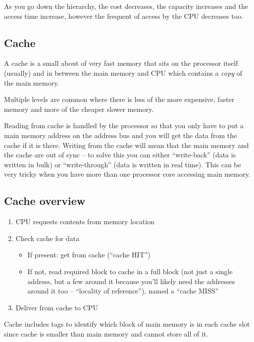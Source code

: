 As you go down the hierarchy, the cost decreases, the capacity increases and the access time increase, however the frequent of access by the CPU decreases too.

\subsection{Cache}\label{sub:cache}

A cache is a small about of very fast memory that sits on the processor itself (usually) and in between the main memory and CPU which contains a \emph{copy} of the main memory.

Multiple levels are common where there is less of the more expensive, faster memory and more of the cheaper slower memory.

Reading from cache is handled by the processor so that you only have to put a main memory address on the address bus and you will get the data from the cache if it is there.
Writing from the cache will mean that the main memory and the cache are out of sync -- to solve this you can either ``write-back'' (data is written in bulk) or ``write-through'' (data is written in real time).
This can be very tricky when you have more than one processor core accessing main memory.

\subsection{Cache overview}\label{sub:cache_overview}

\begin{enumerate}
	\item CPU requests contents from memory location
	\item Check cache for data
	      \begin{itemize}
		      \item If present: get from cache (``cache HIT'')
		      \item If not, read required block to cache in a full block (not just a single address, but a few around it because you'll likely need the addresses around it too -- ``locality of reference''), named a ``cache MISS''
	      \end{itemize}
	\item Deliver from cache to CPU
\end{enumerate}
Cache includes tags to identify which block of main memory is in each cache slot since cache is smaller than main memory and cannot store all of it.

